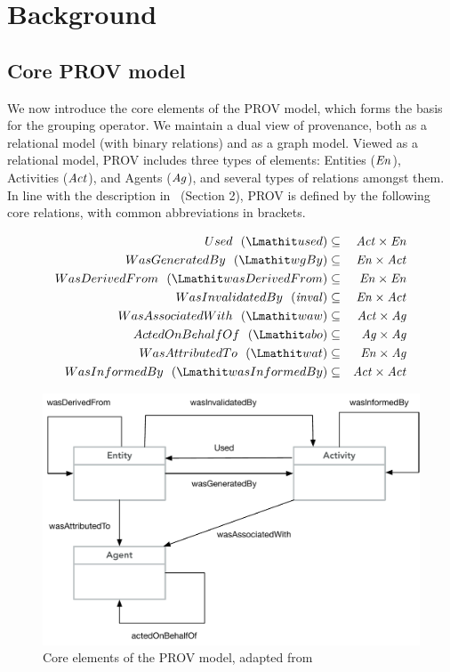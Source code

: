 
\section{Background}
\label{sec:prov-background}

\subsection{Core PROV model} \label{sec:prov-core}

We now introduce the core elements of the PROV model, which forms the basis for the grouping operator.
%
We maintain a dual view of provenance, both as a relational model (with binary relations) and as a graph model. Viewed as a relational model, PROV includes three types of elements: Entities ($\mathit{En}$), Activities ($\mathit{Act}$), and Agents ($\mathit{Ag}$), and several types of relations amongst them. 
In line with the description in~\citep{w3c-prov-dm} (Section 2), PROV is defined by the following core relations, with common abbreviations in brackets. 

\begin{eqnarray*}
Used~~(\used)  & \subseteq & \act \times \en \\
WasGeneratedBy~~(\wgby) & \subseteq  & \en \times \act \\
WasDerivedFrom~~(\wdf) & \subseteq   & \en \times \en \\
WasInvalidatedBy~~(\inv) &  \subseteq &  \en \times \act \\
WasAssociatedWith~~(\waw) & \subseteq & \act \times \ag \\
ActedOnBehalfOf~~(\delegate) & \subseteq & \ag \times \ag \\ 
WasAttributedTo~~(\attrTo) & \subseteq & \en \times \ag \\
WasInformedBy~~(\wasInfBy) & \subseteq & \act \times \act
\end{eqnarray*}


\begin{figure}
\centering
\includegraphics[scale=.45]{figures/prov-essentials.pdf} 
\caption{Core elements of the PROV model, adapted from~\citep{w3c-prov-dm}}
\label{fig:prov-core}
\end{figure}

